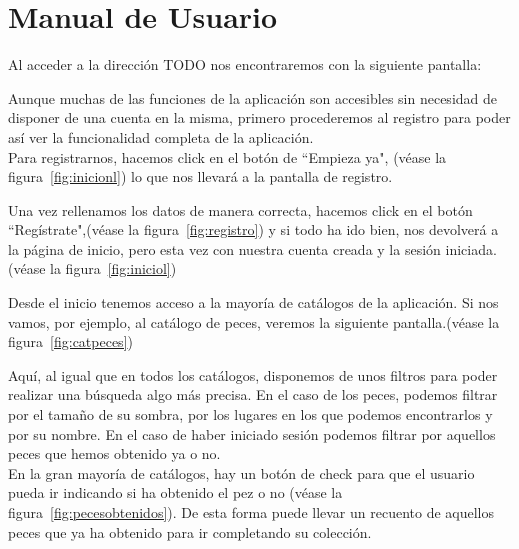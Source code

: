 \chapter{Manual de Usuario}\label{manual}

Al acceder a la dirección TODO nos encontraremos con la siguiente pantalla:\\


Aunque muchas de las funciones de la aplicación son accesibles sin necesidad de disponer de una cuenta en la misma, primero procederemos al registro para poder así ver la funcionalidad completa de la aplicación.\\

Para registrarnos, hacemos click en el botón de ``Empieza ya", {(v\'ease la figura~\ref{fig:inicionl})} lo que nos llevará a la pantalla de registro.\\

\clearpage


Una vez rellenamos los datos de manera correcta, hacemos click en el botón ``Regístrate",{(v\'ease la figura~\ref{fig:registro})} y si todo ha ido bien, nos devolverá a la página de inicio, pero esta vez con nuestra cuenta creada y la sesión iniciada.{(v\'ease la figura~\ref{fig:iniciol})}\\


\clearpage

Desde el inicio tenemos acceso a la mayoría de catálogos de la aplicación. Si nos vamos, por ejemplo, al catálogo de peces, veremos la siguiente pantalla.{(v\'ease la figura~\ref{fig:catpeces})}\\


Aquí, al igual que en todos los catálogos, disponemos de unos filtros para poder realizar una búsqueda algo más precisa. En el caso de los peces, podemos filtrar por el tamaño de su sombra, por los lugares en los que podemos encontrarlos y por su nombre. En el caso de haber iniciado sesión podemos filtrar por aquellos peces que hemos obtenido ya o no.\\

En la gran mayoría de catálogos, hay un botón de check para que el usuario pueda ir indicando si ha obtenido el pez o no {(v\'ease la figura~\ref{fig:pecesobtenidos})}. De esta forma puede llevar un recuento de aquellos peces que ya ha obtenido para ir completando su colección.\\

